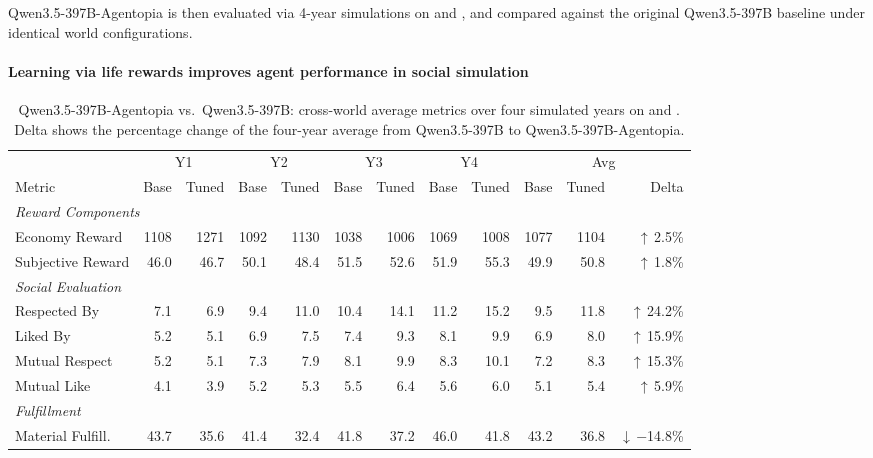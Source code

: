 Qwen3.5-397B-Agentopia is then evaluated via 4-year simulations
on \campus{} and \apartment{},
and compared against the original Qwen3.5-397B baseline
under identical world configurations.

\paragraph{Learning via life rewards improves agent performance in social simulation}
\begin{table}[t]
\caption{%
Qwen3.5-397B-Agentopia vs.\ Qwen3.5-397B: cross-world average metrics over four simulated years on \campus{} and \apartment{}.
Delta shows the percentage change of the four-year average from Qwen3.5-397B to Qwen3.5-397B-Agentopia.}
\label{tab:sft_cross_world}
\centering
\small
\setlength{\tabcolsep}{3pt}
\begin{tabular}{l rrrr rrrr rrr}
\toprule
& \multicolumn{2}{c}{Y1} & \multicolumn{2}{c}{Y2} & \multicolumn{2}{c}{Y3} & \multicolumn{2}{c}{Y4} & \multicolumn{3}{c}{Avg} \\
\cmidrule(lr){2-3} \cmidrule(lr){4-5} \cmidrule(lr){6-7} \cmidrule(lr){8-9} \cmidrule(lr){10-12}
Metric & Base & Tuned & Base & Tuned & Base & Tuned & Base & Tuned & Base & Tuned & Delta \\
\midrule
\multicolumn{12}{l}{\textit{Reward Components}} \\
Economy Reward & 1108 & 1271 & 1092 & 1130 & 1038 & 1006 & 1069 & 1008 & 1077 & 1104 & $\uparrow$\,2.5\% \\
Subjective Reward & 46.0 & 46.7 & 50.1 & 48.4 & 51.5 & 52.6 & 51.9 & 55.3 & 49.9 & 50.8 & $\uparrow$\,1.8\% \\
\midrule
\multicolumn{12}{l}{\textit{Social Evaluation}} \\
Respected By & 7.1 & 6.9 & 9.4 & 11.0 & 10.4 & 14.1 & 11.2 & 15.2 & 9.5 & 11.8 & $\uparrow$\,24.2\% \\
Liked By & 5.2 & 5.1 & 6.9 & 7.5 & 7.4 & 9.3 & 8.1 & 9.9 & 6.9 & 8.0 & $\uparrow$\,15.9\% \\
Mutual Respect & 5.2 & 5.1 & 7.3 & 7.9 & 8.1 & 9.9 & 8.3 & 10.1 & 7.2 & 8.3 & $\uparrow$\,15.3\% \\
Mutual Like & 4.1 & 3.9 & 5.2 & 5.3 & 5.5 & 6.4 & 5.6 & 6.0 & 5.1 & 5.4 & $\uparrow$\,5.9\% \\
\midrule
\multicolumn{12}{l}{\textit{Fulfillment}} \\
Material Fulfill. & 43.7 & 35.6 & 41.4 & 32.4 & 41.8 & 37.2 & 46.0 & 41.8 & 43.2 & 36.8 & $\downarrow$\,$-$14.8\% \\

\end{tabular}
\end{table}
